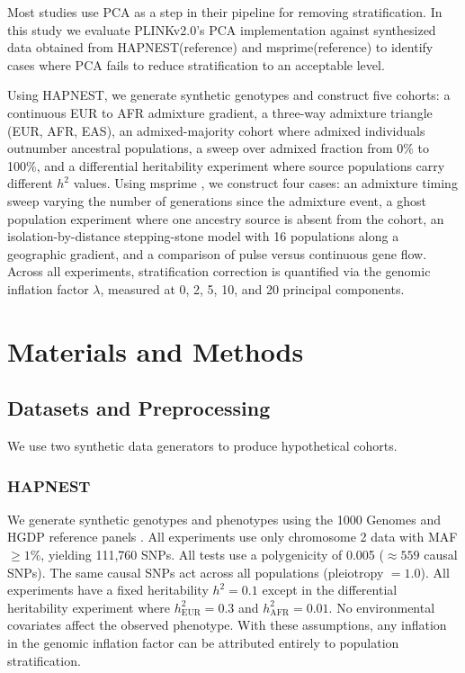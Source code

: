 \documentclass[unnumsec,webpdf,contemporary,large]{oup-authoring-template}
\theoremstyle{thmstyleone}
\theoremstyle{thmstyletwo}
\theoremstyle{thmstylethree}
\begin{document}
Most studies use PCA as a step in their pipeline for removing stratification. In this study we evaluate PLINKv2.0's PCA implementation against synthesized data obtained from HAPNEST(reference) and msprime(reference) to identify cases where PCA fails to reduce stratification to an acceptable level.

Using HAPNEST, we generate synthetic genotypes and construct five cohorts: a continuous EUR to AFR admixture gradient, a three-way admixture triangle (EUR, AFR, EAS), an admixed-majority cohort where admixed individuals outnumber ancestral populations, a sweep over admixed fraction from 0\% to 100\%, and a differential heritability experiment where source populations carry different $h^2$ values. Using msprime \citep{msprime}, we construct four cases: an admixture timing sweep varying the number of generations since the admixture event, a ghost population experiment where one ancestry source is absent from the cohort, an isolation-by-distance stepping-stone model with 16 populations along a geographic gradient, and a comparison of pulse versus continuous gene flow. Across all experiments, stratification correction is quantified via the genomic inflation factor $\lambda$, measured at 0, 2, 5, 10, and 20 principal components.

\section{Materials and Methods}

\subsection{Datasets and Preprocessing}
We use two synthetic data generators to produce hypothetical cohorts.

\subsubsection{HAPNEST}
We generate synthetic genotypes and phenotypes using the 1000 Genomes and HGDP reference panels \citep{hapnest}. All experiments use only chromosome 2 data with MAF $\geq 1\%$, yielding 111,760 SNPs. All tests use a polygenicity of 0.005 ($\approx 559$ causal SNPs). The same causal SNPs act across all populations (pleiotropy $= 1.0$). All experiments have a fixed heritability $h^2 = 0.1$ except in the differential heritability experiment where $h^2_{\text{EUR}} = 0.3$ and $h^2_{\text{AFR}} = 0.01$. No environmental covariates affect the observed phenotype. With these assumptions, any inflation in the genomic inflation factor can be attributed entirely to population stratification.
\end{document}
